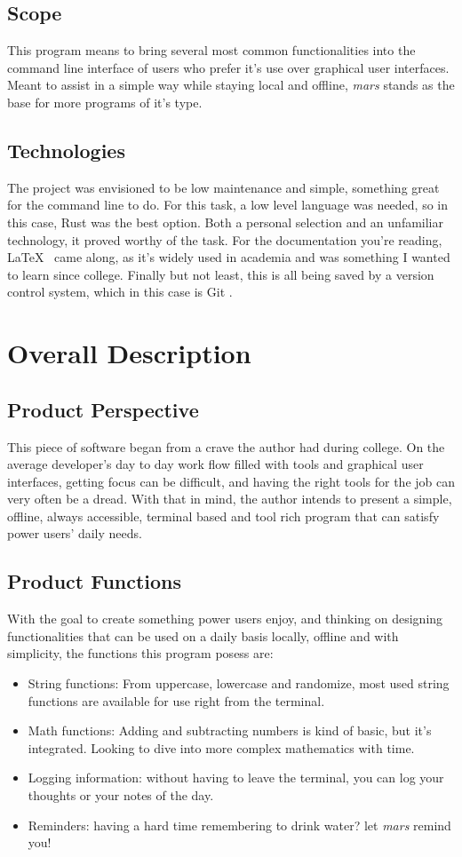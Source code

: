 \documentclass{report}
\begin{document}
\section{Scope}
This program means to bring several most common functionalities into the command line interface of users who prefer it's use over graphical user interfaces. Meant to assist in a simple way while staying local and offline, \emph{mars} stands as the base for more programs of it's type.

\section{Technologies}
The project was envisioned to be low maintenance and simple, something great for the command line to do. For this task, a low level language was needed, so in this case, Rust \cite{RustProgrammingLanguage} was the best option. Both a personal selection and an unfamiliar technology, it proved worthy of the task. For the documentation you're reading, \LaTeX\ \cite{LaTeXDocumentPreparation} came along, as it's widely used in academia and was something I wanted to learn since college. Finally but not least, this is all being saved by a version control system, which in this case is Git \cite{Git}.

\chapter{Overall Description}
\section{Product Perspective}
This piece of software began from a crave the author had during college. On the average developer's day to day work flow filled with tools and graphical user interfaces, getting focus can be difficult, and having the right tools for the job can very often be a dread. With that in mind, the author intends to present a simple, offline, always accessible, terminal based and tool rich program that can satisfy power users' daily needs.

\section{Product Functions}
With the goal to create something power users enjoy, and thinking on designing functionalities that can be used on a daily basis locally, offline and with simplicity, the functions this program posess are:
\begin{itemize}
\item{String functions: From uppercase, lowercase and randomize, most used string functions are available for use right from the terminal.}
\item{Math functions: Adding and subtracting numbers is kind of basic, but it's integrated. Looking to dive into more complex mathematics with time.}
\item{Logging information: without having to leave the terminal, you can log your thoughts or your notes of the day.}
\item{Reminders: having a hard time remembering to drink water? let \emph{mars} remind you!}
\end{itemize}
\end{document}

